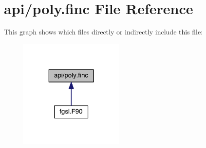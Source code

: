 \hypertarget{poly_8finc}{\section{api/poly.finc File Reference}
\label{poly_8finc}
}
This graph shows which files directly or indirectly include this file\-:
\nopagebreak
\begin{figure}[H]
\begin{center}
\leavevmode
\includegraphics[width=148pt]{poly_8finc__dep__incl}
\end{center}
\end{figure}
